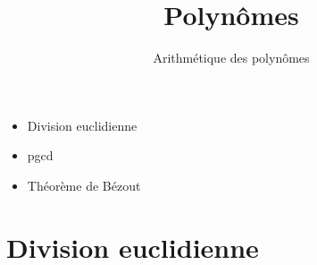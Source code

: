 


\newcommand{\ppcm}{\mathop{\text{ppcm}}\nolimits}






\title{{\bf Polynômes}}
\subtitle{Arithmétique des polynômes}

\begin{frame}
  
  \debutmontitre

  \pause

{\footnotesize
\hfill
{}
\begin{minipage}{0.6\textwidth}
  \begin{itemize}
    \item<3-> Division euclidienne
    \item<4-> pgcd
    \item<5-> Théorème de Bézout
  \end{itemize}
\end{minipage}
}

\end{frame}

\setcounter{framenumber}{0}




\section{Division euclidienne}

